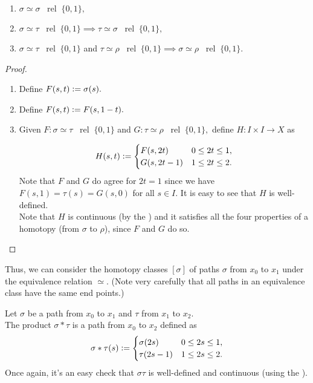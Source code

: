 \documentclass[12pt]{article}
\newcommand{\rel}{\;\;\operatorname{rel}\;}
\begin{document}
\begin{prop} \label{prop:equivrel}
	\begin{enumerate}
		\item $\sigma \simeq \sigma \rel \{0, 1\},$
		\item $\sigma \simeq \tau \rel \{0, 1\} \implies \tau \simeq \sigma \rel \{0, 1\},$
		\item $\sigma \simeq \tau \rel \{0, 1\}$ and $\tau \simeq \rho \rel \{0, 1\} \implies \sigma \simeq \rho \rel \{0, 1\}.$ 
	\end{enumerate}
\end{prop}
\begin{proof} 
	\begin{enumerate}
		\item Define $F(s, t) \vcentcolon= \sigma(s).$
		\item Define $F(s, t) \vcentcolon= F(s, 1 - t).$
		\item Given $F:\sigma \simeq \tau \rel \{0, 1\}$ and $G:\tau \simeq \rho \rel \{0, 1\},$ define $H:I \times I \to X$ as

		\begin{equation*} 
			H(s, t) \vcentcolon= \begin{cases}
				F(s, 2t) & 0 \le 2t \le 1,\\
				G(s, 2t - 1) & 1 \le 2t \le 2.
			\end{cases}
		\end{equation*}
		Note that $F$ and $G$ do agree for $2t = 1$ since we have $F(s, 1) = \tau(s) = G(s, 0)$ for all $s \in I.$ It is easy to see that $H$ is well-defined.\\
		Note that $H$ is continuous (by the ) and it satisfies all the four properties of a homotopy (from $\sigma$ to $\rho$), since $F$ and $G$ do so. \qedhere
	\end{enumerate}
\end{proof}
Thus, we can consider the homotopy classes $[\sigma]$ of paths $\sigma$ from $x_0$ to $x_1$ under the equivalence relation $\simeq.$ (Note very carefully that all paths in an equivalence class have the same end points.)

\begin{defn}
	Let $\sigma$ be a path from $x_0$ to $x_1$ and $\tau$ from $x_1$ to $x_2.$\\
	The product $\sigma*\tau$ is a path from $x_0$ to $x_2$ defined as
	\begin{equation*} 
		\sigma*\tau(s) \vcentcolon= \begin{cases}
			\sigma(2s) & 0 \le 2s \le 1,\\
			\tau(2s - 1) & 1 \le 2s \le 2.
		\end{cases}
	\end{equation*}
	Once again, it's an easy check that $\sigma\tau$ is well-defined and continuous (using the ).
\end{defn}
\end{document}

